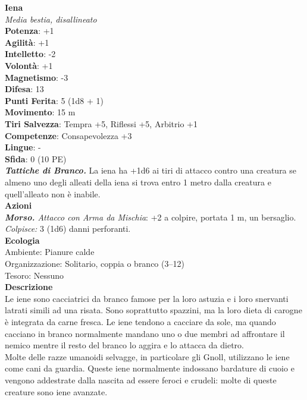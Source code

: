 \begin{multicols}{2}
\medskip\textbf{Iena}\\
\emph{Media bestia, disallineato}\\
\textbf{Potenza}: +1\\
\textbf{Agilità}: +1\\
\textbf{Intelletto}: -2\\
\textbf{Volontà}: +1\\
\textbf{Magnetismo}: -3\\
\textbf{Difesa}: 13\\
\textbf{Punti Ferita}: 5 (1d8 + 1)\\
\textbf{Movimento}: 15 m\\
\textbf{Tiri Salvezza}: Tempra +5, Riflessi +5, Arbitrio +1 \\
\textbf{Competenze}: Consapevolezza +3\\
\textbf{Lingue}: -\\
\textbf{Sfida}: 0 (10 PE)\smallskip\\
\emph{\textbf{Tattiche di Branco.}} La iena ha +1d6 ai tiri di attacco contro una creatura se almeno uno degli alleati della iena si trova entro 1 metro dalla creatura e quell'alleato non è inabile.\\
\smallskip\textbf{Azioni}\\
\emph{\textbf{Morso.} Attacco con Arma da Mischia}: +2 a colpire, portata 1 m, un bersaglio.\\
\emph{Colpisce:} 3 (1d6) danni perforanti.\\
\textbf{Ecologia}\\
Ambiente: Pianure calde\\
Organizzazione: Solitario, coppia o branco (3–12)\\
Tesoro: Nessuno\\
\textbf{Descrizione}\\

Le iene sono cacciatrici da branco famose per la loro astuzia e i loro snervanti latrati simili ad una risata. Sono soprattutto spazzini, ma la loro dieta di carogne è integrata da carne fresca. Le iene tendono a cacciare da sole, ma quando cacciano in branco normalmente mandano uno o due membri ad affrontare il nemico mentre il resto del branco lo aggira e lo attacca da dietro.\\

Molte delle razze umanoidi selvagge, in particolare gli Gnoll, utilizzano le iene come cani da guardia. Queste iene normalmente indossano bardature di cuoio e vengono addestrate dalla nascita ad essere feroci e crudeli: molte di queste creature sono iene avanzate. \\



\end{multicols}
